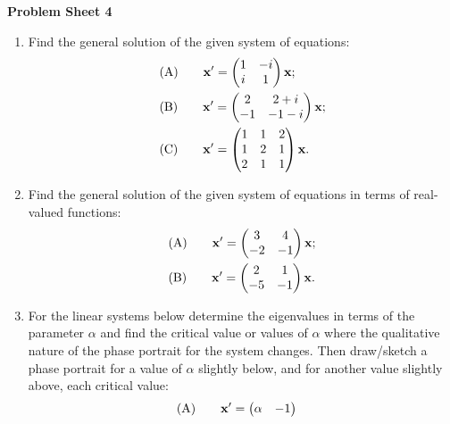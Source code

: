 \documentclass[11pt,a4paper]{article}
\begin{document}
	\begin{center}
		\textbf{Problem Sheet 4}
	\end{center}
	\begin{enumerate}
		\item Find the general solution of the given system of equations:
		\begin{align*}
			& \text{(A)}\qquad \vb{x}^\prime =
			\begin{pmatrix}
				1 & -i\\
				i & 1
			\end{pmatrix}\vb{x};\\
			&	\text{(B)}\qquad \vb{x}^\prime=
			\begin{pmatrix}
				2 & 2+i\\
				-1 & -1-i
			\end{pmatrix}\vb{x};\\
			& \text{(C)}\qquad \vb{x}^\prime =
			\begin{pmatrix}
				1 & 1 & 2\\
				1 & 2 & 1\\
				2 & 1 & 1
			\end{pmatrix}\vb{x}.
		\end{align*}
		\item Find the general solution of the given system of equations in terms of real-valued functions:
		\begin{align*}
			& \text{(A)}\qquad \vb{x}^\prime =
			\begin{pmatrix}
				3 & 4\\
				-2 & -1
			\end{pmatrix}\vb{x};\\
			& \text{(B)}\qquad \vb{x}^\prime =
			\begin{pmatrix}
				2 & 1\\
				-5 & -1
			\end{pmatrix}\vb{x}. 
		\end{align*}
		\item For the linear systems below determine the eigenvalues in terms of the parameter $\alpha$ and find the critical value or values of $\alpha$ where the qualitative nature of the phase portrait for the system changes. Then draw/sketch a phase portrait for a value of $\alpha$ slightly below, and for another value slightly above, each critical value:
		\begin{align*}
			&\text{(A)}\qquad \vb{x}^\prime =
			\begin{pmatrix}
				\alpha & -1\\

\end{pmatrix}
\end{align*}
\end{enumerate}
\end{document}
